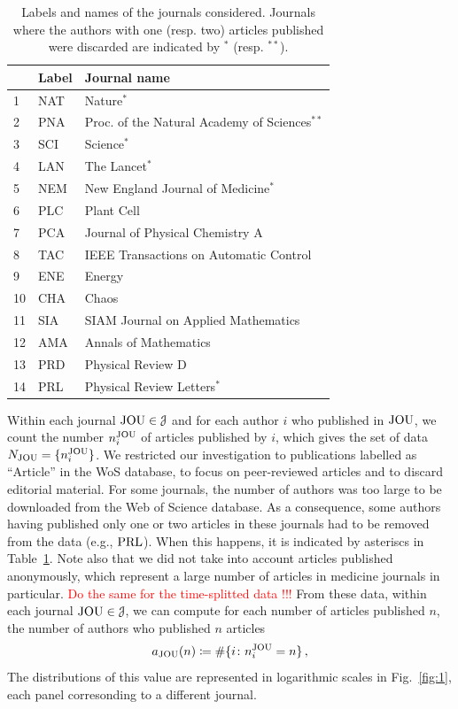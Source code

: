 \documentclass[aps,prl,floatfix,twocolumn]{revtex4-1}
\begin{document}
\begin{table}
 \begin{tabular}{l|l|l}
  & Label & Journal name \\
  \hline
  \hline 1 & NAT & Nature$^*$ \\
  \hline 2 & PNA & Proc. of the Natural Academy of Sciences$^{**}$ \\
  \hline 3 & SCI & Science$^*$ \\
  \hline 4 & LAN & The Lancet$^*$ \\
  \hline 5 & NEM & New England Journal of Medicine$^*$ \\
  \hline 6 & PLC & Plant Cell \\
  \hline 7 & PCA & Journal of Physical Chemistry A \\
  \hline 8 & TAC & IEEE Transactions on Automatic Control \\
  \hline 9 & ENE & Energy \\
  \hline 10 & CHA & Chaos \\
  \hline 11 & SIA & SIAM Journal on Applied Mathematics \\
  \hline 12 & AMA & Annals of Mathematics \\
  \hline 13 & PRD & Physical Review D \\
  \hline 14 & PRL & Physical Review Letters$^*$ 
 \end{tabular}
 \caption{Labels and names of the journals considered. 
 Journals where the authors with one (resp. two) articles published were discarded are indicated by $^*$ (resp. $^{**}$).}
 \label{tab:journals}
\end{table}

Within each journal ${\rm JOU}\in {\cal J}$ and for each author $i$ who published in ${\rm JOU}$, we count the number $n^{\rm JOU}_i$ of articles published by $i$, which gives the set of data $N_{\rm JOU}=\{n^{\rm JOU}_i\}$. 
We restricted our investigation to publications labelled as ``Article'' in the WoS database, to focus on peer-reviewed articles and to discard editorial material. 
For some journals, the number of authors was too large to be downloaded from the Web of Science database. 
As a consequence, some authors having published only one or two articles in these journals had to be removed from the data (e.g., ${\rm PRL}$). 
When this happens, it is indicated by asteriscs in Table~\ref{tab:journals}.
Note also that we did not take into account articles published anonymously, which represent a large number of articles in medicine journals in particular. 
\textcolor{red}{Do the same for the time-splitted data !!!}
From these data, within each journal ${\rm JOU}\in{\cal J}$, we can compute for each number of articles published $n$, the number of authors who published $n$ articles 
\begin{align}
 a_{\rm JOU}(n)\coloneqq\#\{i\colon n^{\rm JOU}_i = n\}\, ,
\end{align}
The distributions of this value are represented in logarithmic scales in Fig.~\ref{fig:1}, each panel corresonding to a different journal. 
\end{document}

